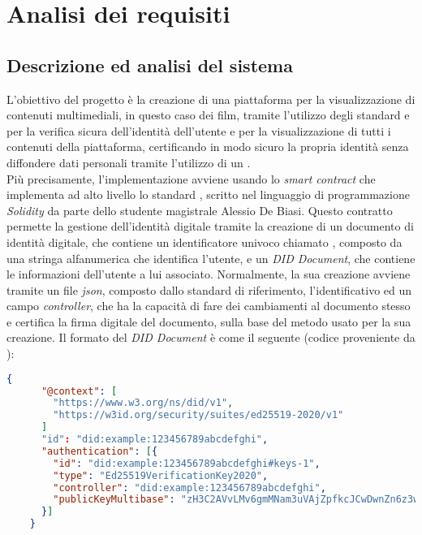 \chapter{Analisi dei requisiti}
\label{cap:analisi-requisiti}


\section{Descrizione ed analisi del sistema}
L'obiettivo del progetto è la creazione di una piattaforma per la visualizzazione di contenuti multimediali, in questo caso dei film,
tramite l'utilizzo degli standard   e  per la verifica sicura dell'identità dell'utente e per la 
visualizzazione di tutti i contenuti della piattaforma, certificando in modo sicuro la propria identità senza diffondere dati personali tramite 
l'utilizzo di un .\\

Più precisamente, l'implementazione avviene usando lo \textit{smart contract} che implementa ad alto livello lo standard , 
scritto nel linguaggio di programmazione \textit{Solidity} da parte dello studente magistrale Alessio De Biasi.
Questo contratto permette la gestione dell'identità digitale tramite la creazione di un documento di identità digitale, che contiene un identificatore univoco
chiamato , composto da una stringa alfanumerica che identifica l'utente, e un \textit{DID Document}, che contiene le informazioni dell'utente a lui associato.
Normalmente, la sua creazione avviene tramite un file \textit{json}, composto dallo standard di riferimento, l'identificativo ed un campo \textit{controller},
che ha la capacità di fare dei cambiamenti al documento stesso e certifica la firma digitale del documento, sulla base del metodo usato per la sua creazione.
Il formato del \textit{DID Document} è come il seguente (codice proveniente da \cite{site:didw3c}):

\begin{lstlisting}[language=json]
    {
      "@context": [
        "https://www.w3.org/ns/did/v1",
        "https://w3id.org/security/suites/ed25519-2020/v1"
      ]
      "id": "did:example:123456789abcdefghi",
      "authentication": [{    
        "id": "did:example:123456789abcdefghi#keys-1",
        "type": "Ed25519VerificationKey2020",
        "controller": "did:example:123456789abcdefghi",
        "publicKeyMultibase": "zH3C2AVvLMv6gmMNam3uVAjZpfkcJCwDwnZn6z3wXmqPV"
      }]
    }
\end{lstlisting}

